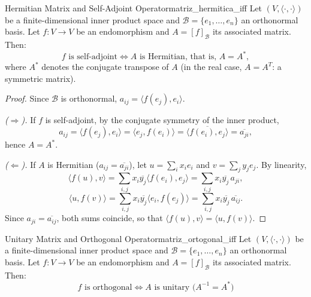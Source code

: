 \documentclass[11pt, a4paper]{article}
\begin{document}
\begin{proposicion}{Hermitian Matrix and Self-Adjoint Operator}{matriz_hermitica_iff}
Let $(V, \langle \cdot, \cdot \rangle)$ be a finite-dimensional inner product space and $\mathcal{B} = \{e_1, \dots, e_n\}$ an orthonormal basis.
Let $f: V \to V$ be an endomorphism and $A = [f]_\mathcal{B}$ its associated matrix.
Then:
\[ f \text{ is self-adjoint} \iff A \text{ is Hermitian, that is, } A = A^*, \]
where $A^*$ denotes the conjugate transpose of $A$ (in the real case, $A = A^T$: a symmetric matrix).
\end{proposicion}

\begin{proof}
Since $\mathcal{B}$ is orthonormal, $a_{ij} = \langle f(e_j), e_i \rangle$.

\textit{($\Rightarrow$).} If $f$ is self-adjoint, by the conjugate symmetry of the inner product,
\[ a_{ij} = \langle f(e_j), e_i \rangle = \langle e_j, f(e_i) \rangle = \overline{\langle f(e_i), e_j \rangle} = \overline{a_{ji}}, \]
hence $A = A^*$.

\textit{($\Leftarrow$).} If $A$ is Hermitian ($a_{ij} = \overline{a_{ji}}$), let $u = \sum_i x_i e_i$ and $v = \sum_j y_j e_j$. By linearity,
\[ \langle f(u), v \rangle = \sum_{i,j} x_i \overline{y_j} \langle f(e_i), e_j \rangle = \sum_{i,j} x_i \overline{y_j}\, a_{ji}, \]
\[ \langle u, f(v) \rangle = \sum_{i,j} x_i \overline{y_j} \langle e_i, f(e_j) \rangle = \sum_{i,j} x_i \overline{y_j}\, \overline{a_{ij}}. \]
Since $a_{ji} = \overline{a_{ij}}$, both sums coincide, so that $\langle f(u), v \rangle = \langle u, f(v) \rangle$.
\end{proof}

\begin{proposicion}{Unitary Matrix and Orthogonal Operator}{matriz_ortogonal_iff}
Let $(V, \langle \cdot, \cdot \rangle)$ be a finite-dimensional inner product space and $\mathcal{B} = \{e_1, \dots, e_n\}$ an orthonormal basis.
Let $f: V \to V$ be an endomorphism and $A = [f]_\mathcal{B}$ its associated matrix.
Then:
\[ f \text{ is orthogonal} \iff A \text{ is unitary (} A^{-1} = A^* \text{)} \]
\end{proposicion}
\end{document}
